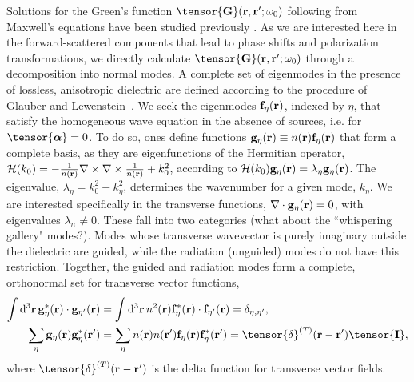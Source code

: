 \documentclass[preprint,aps,pra,onecolumn]{revtex4-1} %
\newcommand{\fidx}{\eta}
\newcommand{\unittens}{\tensor{\mathbf{I}}}
\newcommand{\eigenf}{\mbf{f}_\fidx}
\newcommand{\eigenfp}{\mbf{f}_{\fidx'}}
\newcommand{\eigeng}{\mbf{g}_\fidx}
\newcommand{\eigengp}{\mbf{g}_{\fidx'}}
\newcommand{\comment}[1]{{\color{Maroon} #1}}
\begin{document}
Solutions for the Green's function $\tensor{\mathbf{G}}(\br ,\br' ; \omega_0)$ following from Maxwell's equations 
have been studied previously \cite{sakoda_optical_1996,sondergaard_general_2001,wubs_multiple-scattering_2004}.  As we are interested here in the forward-scattered components that lead to phase shifts and polarization transformations, we directly calculate $\tensor{\mathbf{G}}(\br ,\br' ; \omega_0)$ through a decomposition into normal modes.  A complete set of eigenmodes in the presence of lossless, anisotropic dielectric are defined according to the procedure of Glauber and Lewenstein~\cite{glauber_quantum_1991}.  We seek the eigenmodes $\eigenf(\mathbf{r})$, indexed by $\fidx$, that satisfy the homogeneous wave equation in the absence of sources, i.e.  for $\tensor{\boldsymbol{\alpha}} = 0$.  To do so, ones define functions $\eigeng(\mbf{r}) \equiv n(\br) \eigenf(\mbf{r})$ that form a complete basis, as they are eigenfunctions of the Hermitian operator, $\mathcal{H}(k_0) = -\frac{1}{n(\mathbf{r})} \nabla\times\nabla\times \frac{1}{n(\mathbf{r})} + k_0^2$, according to $\mathcal{H}(k_0)  \eigeng(\mbf{r}) = \lambda_\fidx \eigeng(\mbf{r})$. The eigenvalue, $\lambda_\fidx= k_0^2-k_\fidx^2$, determines the wavenumber for a given mode, $k_\fidx$.  We are interested specifically in the transverse functions, $\nabla \cdot \eigeng(\br) = 0$, with eigenvalues $\lambda_n \neq 0$.  These fall into two categories \comment{(what about the ``whispering gallery" modes?)}.  Modes whose transverse wavevector is purely imaginary outside the dielectric are guided, while the radiation (unguided) modes do not have this restriction. Together, the guided and radiation modes form a complete, orthonormal set for transverse vector functions,
	\begin{align}
	\int \mathrm{d}^3\br \, \eigeng^*(\mbf{r}) \cdot \eigengp(\mbf{r})  &= \int \mathrm{d}^3\br \, n^2(\br) \eigenf^* (\br)\cdot  \eigenfp(\br) =\delta_{\fidx, \fidx'},\label{Eq::Orthogonality}\\
	\sum_\fidx \eigeng(\br) \eigeng^*(\br') &= \sum_\fidx n(\br)n(\br') \eigenf(\br) \eigenf^*(\br') =\tensor{\delta}^{(T)}(\br-\br')  \unittens, \label{Eq::Completeness}
	\end{align}
where $\tensor{\delta}^{(T)}(\br-\br')$ is the delta function for transverse vector fields.  
\end{document}
